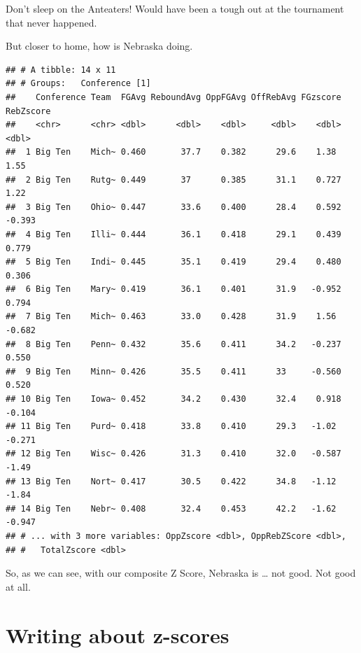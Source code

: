 \documentclass[
]{book}
\newenvironment{Shaded}{\begin{snugshade}}{\end{snugshade}}
\newcommand{\KeywordTok}[1]{\textcolor[rgb]{0.13,0.29,0.53}{\textbf{#1}}}
\newcommand{\NormalTok}[1]{#1}
\newcommand{\OperatorTok}[1]{\textcolor[rgb]{0.81,0.36,0.00}{\textbf{#1}}}
\newcommand{\StringTok}[1]{\textcolor[rgb]{0.31,0.60,0.02}{#1}}
\begin{document}
Don't sleep on the Anteaters! Would have been a tough out at the tournament that never happened.

But closer to home, how is Nebraska doing.

\begin{Shaded}
\end{Shaded}

\begin{verbatim}
## # A tibble: 14 x 11
## # Groups:   Conference [1]
##    Conference Team  FGAvg ReboundAvg OppFGAvg OffRebAvg FGzscore RebZscore
##    <chr>      <chr> <dbl>      <dbl>    <dbl>     <dbl>    <dbl>     <dbl>
##  1 Big Ten    Mich~ 0.460       37.7    0.382      29.6    1.38      1.55 
##  2 Big Ten    Rutg~ 0.449       37      0.385      31.1    0.727     1.22 
##  3 Big Ten    Ohio~ 0.447       33.6    0.400      28.4    0.592    -0.393
##  4 Big Ten    Illi~ 0.444       36.1    0.418      29.1    0.439     0.779
##  5 Big Ten    Indi~ 0.445       35.1    0.419      29.4    0.480     0.306
##  6 Big Ten    Mary~ 0.419       36.1    0.401      31.9   -0.952     0.794
##  7 Big Ten    Mich~ 0.463       33.0    0.428      31.9    1.56     -0.682
##  8 Big Ten    Penn~ 0.432       35.6    0.411      34.2   -0.237     0.550
##  9 Big Ten    Minn~ 0.426       35.5    0.411      33     -0.560     0.520
## 10 Big Ten    Iowa~ 0.452       34.2    0.430      32.4    0.918    -0.104
## 11 Big Ten    Purd~ 0.418       33.8    0.410      29.3   -1.02     -0.271
## 12 Big Ten    Wisc~ 0.426       31.3    0.410      32.0   -0.587    -1.49 
## 13 Big Ten    Nort~ 0.417       30.5    0.422      34.8   -1.12     -1.84 
## 14 Big Ten    Nebr~ 0.408       32.4    0.453      42.2   -1.62     -0.947
## # ... with 3 more variables: OppZscore <dbl>, OppRebZScore <dbl>,
## #   TotalZscore <dbl>
\end{verbatim}

So, as we can see, with our composite Z Score, Nebraska is \ldots{} not good. Not good at all.

\hypertarget{writing-about-z-scores}{%
\section{Writing about z-scores}\label{writing-about-z-scores}}
\end{document}
